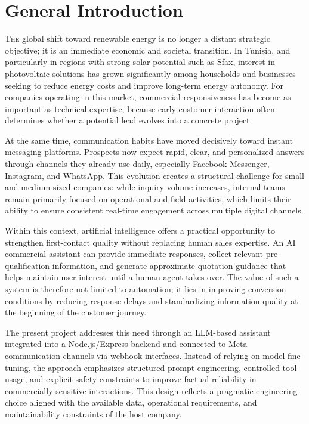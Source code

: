 \setlength{\headheight}{14.49998pt}


\tableofcontents
\listoffigures
\listoftables
\clearpage
{}
\chapter*{\centering General Introduction}



\lettrine{T}{he} global shift toward renewable energy is no longer a distant strategic objective; it is an immediate economic and societal transition. In Tunisia, and particularly in regions with strong solar potential such as Sfax, interest in photovoltaic solutions has grown significantly among households and businesses seeking to reduce energy costs and improve long-term energy autonomy. For companies operating in this market, commercial responsiveness has become as important as technical expertise, because early customer interaction often determines whether a potential lead evolves into a concrete project.

At the same time, communication habits have moved decisively toward instant messaging platforms. Prospects now expect rapid, clear, and personalized answers through channels they already use daily, especially Facebook Messenger, Instagram, and WhatsApp. This evolution creates a structural challenge for small and medium-sized companies: while inquiry volume increases, internal teams remain primarily focused on operational and field activities, which limits their ability to ensure consistent real-time engagement across multiple digital channels.

Within this context, artificial intelligence offers a practical opportunity to strengthen first-contact quality without replacing human sales expertise. An AI commercial assistant can provide immediate responses, collect relevant pre-qualification information, and generate approximate quotation guidance that helps maintain user interest until a human agent takes over. The value of such a system is therefore not limited to automation; it lies in improving conversion conditions by reducing response delays and standardizing information quality at the beginning of the customer journey.

The present project addresses this need through an LLM-based assistant integrated into a Node.js/Express backend and connected to Meta communication channels via webhook interfaces. Instead of relying on model fine-tuning, the approach emphasizes structured prompt engineering, controlled tool usage, and explicit safety constraints to improve factual reliability in commercially sensitive interactions. This design reflects a pragmatic engineering choice aligned with the available data, operational requirements, and maintainability constraints of the host company.

